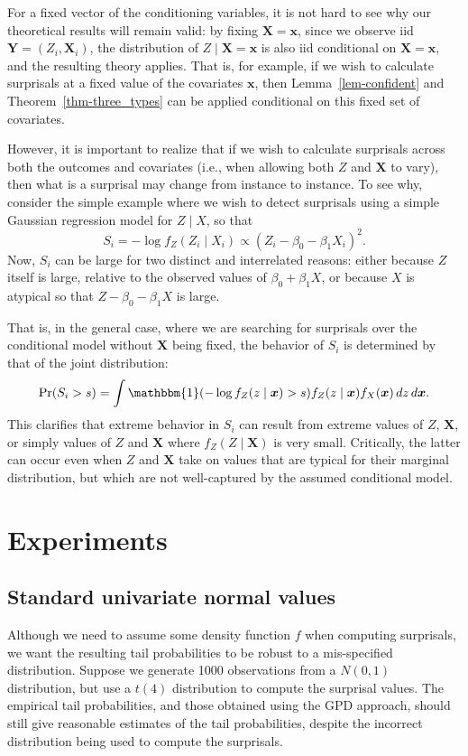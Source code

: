 \documentclass[
  12pt]{article}
\theoremstyle{plain}
\theoremstyle{plain}
\theoremstyle{definition}
\theoremstyle{plain}
\theoremstyle{remark}
\begin{document}
For a fixed vector of the conditioning variables, it is not hard to see
why our theoretical results will remain valid: by fixing
\(\bm{X}=\bm{x}\), since we observe iid \(\bm{Y}=(Z_i,\bm{X}_i)\), the
distribution of \(Z\mid \bm{X}=\bm{x}\) is also iid conditional on
\(\bm{X}=\bm{x}\), and the resulting theory applies. That is, for
example, if we wish to calculate surprisals at a fixed value of the
covariates \(\bm{x}\), then Lemma~\ref{lem-confident} and
Theorem~\ref{thm-three_types} can be applied conditional on this fixed
set of covariates.

However, it is important to realize that if we wish to calculate
surprisals across both the outcomes and covariates (i.e., when allowing
both \(Z\) and \(\bm{X}\) to vary), then what is a surprisal may change
from instance to instance. To see why, consider the simple example where
we wish to detect surprisals using a simple Gaussian regression model
for \(Z\mid X\), so that \[
S_i=-\log f_Z(Z_i\mid X_i)\propto (Z_i-\beta_0-\beta_1 X_i)^2.
\] Now, \(S_i\) can be large for two distinct and interrelated reasons:
either because \(Z\) itself is large, relative to the observed values of
\(\beta_0+\beta_1 X\), or because \(X\) is atypical so that
\(Z-\beta_0-\beta_1 X\) is large.

That is, in the general case, where we are searching for surprisals over
the conditional model without \(\bm{X}\) being fixed, the behavior of
\(S_i\) is determined by that of the joint distribution: \[
\Pr(S_i>s) = \int \mathbbm{1}(-\log f_Z(z \mid \bm{x}) > s) f_Z(z \mid \bm{x}) f_X(\bm{x})\,dz\,d\bm{x}.
\] This clarifies that extreme behavior in \(S_i\) can result from
extreme values of \(Z\), \(\bm{X}\), or simply values of \(Z\) and
\(\bm{X}\) where \(f_Z(Z\mid \bm{X})\) is very small. Critically, the
latter can occur even when \(Z\) and \(\bm{X}\) take on values that are
typical for their marginal distribution, but which are not well-captured
by the assumed conditional model.

\section{Experiments}\label{sec-experiments}

\subsection{Standard univariate normal
values}\label{standard-univariate-normal-values}

Although we need to assume some density function \(f\) when computing
surprisals, we want the resulting tail probabilities to be robust to a
mis-specified distribution. Suppose we generate 1000 observations from a
\(N(0,1)\) distribution, but use a \(t(4)\) distribution to compute the
surprisal values. The empirical tail probabilities, and those obtained
using the GPD approach, should still give reasonable estimates of the
tail probabilities, despite the incorrect distribution being used to
compute the surprisals.
\end{document}
